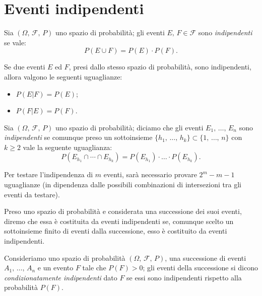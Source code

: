     \section{Eventi indipendenti}
        \begin{defn}\label{defn:Eventi_indipendenti}
            Sia $(\Omega,\,\mathscr{F},\,P)$ uno spazio di probabilità; gli eventi $E,\,F \in \mathscr{F}$ sono \emph{indipendenti} se vale: \[
                P(E \cup F) = P(E) \cdot P(F)
            .\] 
        \end{defn}
        \begin{obsv}
            Se due eventi $E$ ed $F$, presi dallo stesso spazio di probabilità, sono indipendenti, allora valgono le seguenti uguaglianze:
            \begin{itemize}
                \item $P(E|F) = P(E)$;
                \item $P(F|E) = P(F)$.
            \end{itemize}
        \end{obsv}
        \begin{defn}
            Sia $(\Omega,\,\mathscr{F},\,P)$ uno spazio di probabilità; diciamo che gli eventi $E_1,\, \ldots,\, E_n$ sono \emph{indipendenti} se comunque preso un sottoinsieme $\{h_1,\, \ldots,\, h_k\} \subset \{1,\, \ldots,\, n\}$ con $k \geq 2$ vale la seguente uguaglianza: \[
                P(E_{h_1} \cap \dotsm \cap E_{h_k}) = P(E_{h_1}) \cdot \ldots \cdot P(E_{h_k})
            .\] 
        \end{defn}
        \begin{obsv}
            Per testare l'indipendenza di $m$ eventi, sarà necessario provare $2^{m} - m - 1$ uguaglianze (in dipendenza dalle possibili combinazioni di intersezioni tra gli eventi da testare).
        \end{obsv}
        \begin{defn}
            Preso uno spazio di probabilità e considerata una successione dei suoi eventi, diremo che essa è costituita da eventi indipendenti se, comunque scelto un sottoinsieme finito di eventi dalla successione, esso è costituito da eventi indipendenti.
        \end{defn}
        \begin{defn}
            Consideriamo uno spazio di probabilità $(\Omega,\,\mathscr{F},\,P)$, una successione di eventi $A_1,\, \ldots,\, A_n$ e un evento $F$ tale che $P(F) > 0$; gli eventi della successione si dicono \emph{condizionatamente indipendenti} dato $F$ se essi sono indipendenti rispetto alla probabilità $P(F)$.
        \end{defn}
